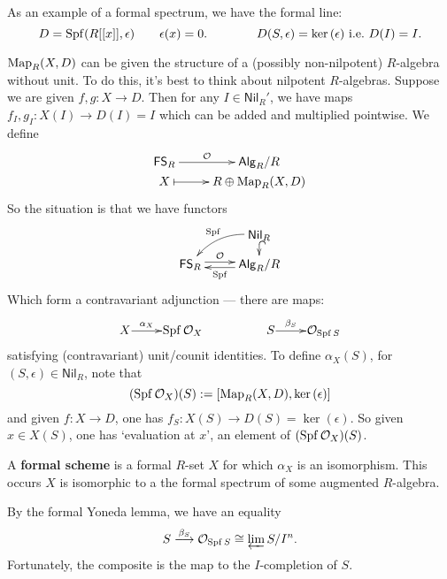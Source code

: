 \documentclass[11pt]{article}
\newcommand{\RAlg}{\mathsf{Alg}_R}
\newcommand{\RNil}{\mathsf{Nil}_R}
\newcommand{\FSR}{\mathsf{FS}_R}
\DeclareMathOperator{\SPf}{Spf}
\begin{document}
\begin{itemise}
\item As an example of a formal spectrum, we have the formal line:
\[D=\SPf(R[[x]],\epsilon)\qquad \epsilon(x)=0.\qquad \qquad D(S,\epsilon)=\ker(\epsilon)\textup{ i.e.\ }D(I)=I.\]
\item $\operatorname{Map}_R(X,D)$ can be given the structure of a (possibly non-nilpotent) $R$-algebra without unit. To do this, it's best to think about nilpotent $R$-algebras. Suppose we are given $f,g:X\to D$. Then for any $I\in\RNil'$, we have maps $f_I,g_I:X(I)\to D(I)=I$ which can be added and multiplied pointwise. We define
\[\xymatrix@R=0mm{
\ar[r]^-{\calO}%
\FSR&%
\RAlg/R\\%
X%
\ar@{|->}[r]&
R\oplus \Map_R(X,D)%
}\]
So the situation is that we have functors
\[\xymatrix@R=.3cm{
&%
\RNil
\ar@/_1em/[ld]_-{\SPf}
\ar@{^{(}->}[d]
\\%
\FSR
\ar@<+.51ex>[r]^-{\calO}
&%
\RAlg/R
\ar@<+.51ex>[l]^-{\SPf}
}\]
Which form a contravariant adjunction --- there are maps:
\[
\vcenter{\xymatrix@1{
X
\ar[r]^-{\alpha_X}
&%
\SPf\calO_X
&%
&%
S
\ar[r]^-{\beta_S}
&%
\calO_{\SPf S}
}}\]
satisfying (contravariant) unit/counit identities.
To define $\alpha_X(S)$, for $(S,\epsilon)\in\RNil$, note that
\[(\SPf\calO_X)(S):=[\Map_R(X,D),\ker(\epsilon)]\]
and given $f:X\to D$, one has $f_S:X(S)\to D(S)=\ker(\epsilon)$. So given $x\in X(S)$, one has `evaluation at $x$', an element of $(\SPf\calO_X)(S)$. 
\item A \textbf{formal scheme} is a formal $R$-set $X$ for which $\alpha_X$ is an isomorphism. This occurs \Iff $X$ is isomorphic to a the formal spectrum of some augmented $R$-algebra.
\item By the formal Yoneda lemma, we have an equality
\[S\overset{\beta_S}{\to}\calO_{\SPf S}\cong \varprojlim S/I^n.\]
Fortunately, the composite is the map to the $I$-completion of $S$.
\end{itemise}
\end{document}

